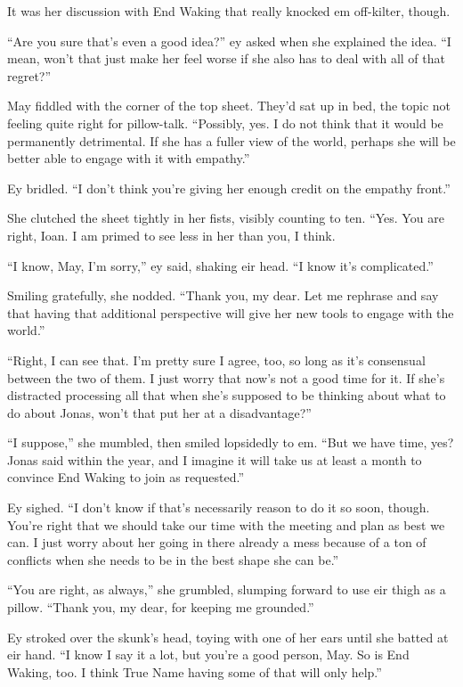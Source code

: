 It was her discussion with End Waking that really knocked em off-kilter, though.

``Are you sure that's even a good idea?'' ey asked when she explained the idea. ``I mean, won't that just make her feel worse if she also has to deal with all of that regret?''

May fiddled with the corner of the top sheet. They'd sat up in bed, the topic not feeling quite right for pillow-talk. ``Possibly, yes. I do not think that it would be permanently detrimental. If she has a fuller view of the world, perhaps she will be better able to engage with it with empathy.''

Ey bridled. ``I don't think you're giving her enough credit on the empathy front.''

She clutched the sheet tightly in her fists, visibly counting to ten. ``Yes. You are right, Ioan. I am primed to see less in her than you, I think.

``I know, May, I'm sorry,'' ey said, shaking eir head. ``I know it's complicated.''

Smiling gratefully, she nodded. ``Thank you, my dear. Let me rephrase and say that having that additional perspective will give her new tools to engage with the world.''

``Right, I can see that. I'm pretty sure I agree, too, so long as it's consensual between the two of them. I just worry that now's not a good time for it. If she's distracted processing all that when she's supposed to be thinking about what to do about Jonas, won't that put her at a disadvantage?''

``I suppose,'' she mumbled, then smiled lopsidedly to em. ``But we have time, yes? Jonas said within the year, and I imagine it will take us at least a month to convince End Waking to join as requested.''

Ey sighed. ``I don't know if that's necessarily reason to do it so soon, though. You're right that we should take our time with the meeting and plan as best we can. I just worry about her going in there already a mess because of a ton of conflicts when she needs to be in the best shape she can be.''

``You are right, as always,'' she grumbled, slumping forward to use eir thigh as a pillow. ``Thank you, my dear, for keeping me grounded.''

Ey stroked over the skunk's head, toying with one of her ears until she batted at eir hand. ``I know I say it a lot, but you're a good person, May. So is End Waking, too. I think True Name having some of that will only help.''

